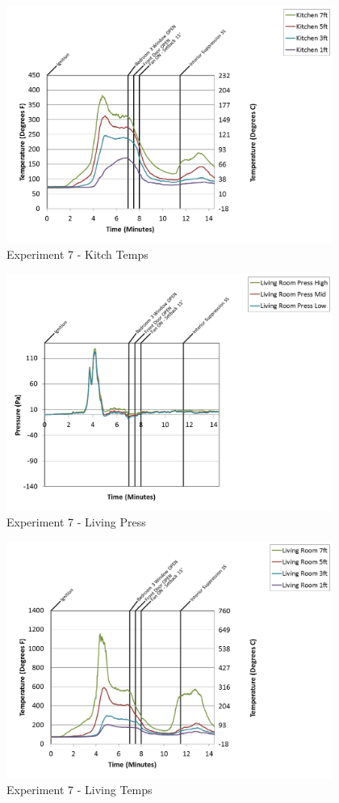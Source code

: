 \documentclass{article}
\begin{document}
\begin{appendices}
\clearpage

\begin{figure}[h!]
	\centering
	\includegraphics[height=3.05in]{0_Images/Results_Charts/Exp_7_Charts/KitchTemps.png}
	\caption{Experiment 7 - Kitch Temps}
\end{figure}


\begin{figure}[h!]
	\centering
	\includegraphics[height=3.05in]{0_Images/Results_Charts/Exp_7_Charts/LivingPress.png}
	\caption{Experiment 7 - Living Press}
\end{figure}

\clearpage

\begin{figure}[h!]
	\centering
	\includegraphics[height=3.05in]{0_Images/Results_Charts/Exp_7_Charts/LivingTemps.png}
	\caption{Experiment 7 - Living Temps}
\end{figure}



\end{appendices}
\end{document}
